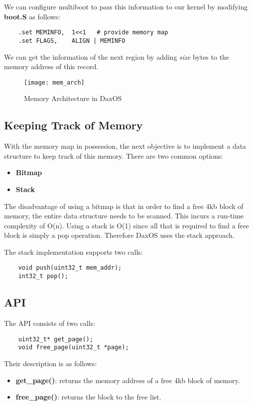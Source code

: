 We can configure multiboot to pass this information to our kernel by modifying \textbf{boot.S} as follows:
\vspace{0.5cm}
\begin{lstlisting}
    .set MEMINFO,  1<<1   # provide memory map
    .set FLAGS,    ALIGN | MEMINFO
\end{lstlisting}
\vspace{0.5cm}

We can get the information of the next region by adding \textit{size} bytes to the memory address of this record.

\begin{figure}[h!]
	\texttt{[image: mem\_arch]}
	\caption{Memory Architecture in DaxOS}
\end{figure}
\clearpage

\pagebreak
\subsection{Keeping Track of Memory}\label{subsection:Keeping Track of Memory}

With the memory map in possession, the next objective is to implement a data structure to keep track of this memory.
There are two common options:
\begin{itemize}
    \item \textbf{Bitmap}
    \item \textbf{Stack}
\end{itemize}

The disadvantage of using a bitmap is that in order to find a free 4kb block of memory, the entire data structure needs
to be scanned. This incurs a run-time complexity of O(n).
Using a stack is O(1) since all that is required to find a free block is simply a pop operation.
Therefore DaxOS uses the stack approach.

\vspace{1cm}
The stack implementation supports two calls:
\begin{lstlisting}
    void push(uint32_t mem_addr);
    int32_t pop();
\end{lstlisting}

\subsection{API}\label{subsection:API}
The API consists of two calls:
\vspace{0.3cm}
\begin{lstlisting}
    uint32_t* get_page();
    void free_page(uint32_t *page);
\end{lstlisting}
Their description is as follows:
\begin{itemize}
    \item \textbf{get\_page()}: returns the memory address of a free 4kb block of memory.
    \item \textbf{free\_page()}: returns the block to the free list.
\end{itemize}
\pagebreak

